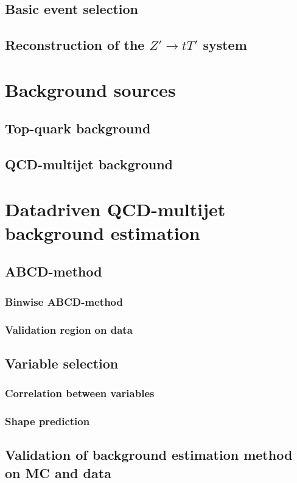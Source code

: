 \subsection{Basic event selection}
\subsection{Reconstruction of the $Z'\rightarrow tT'$ system}

\section{Background sources}
\subsection{Top-quark background}
\subsection{QCD-multijet background}

\section{Datadriven QCD-multijet background estimation}
\subsection{ABCD-method}
\subsubsection{Binwise ABCD-method}
\subsubsection{Validation region on data}
\subsection{Variable selection}
\subsubsection{Correlation between variables}
\subsubsection{Shape prediction}
\subsection{Validation of background estimation method on MC and data}

